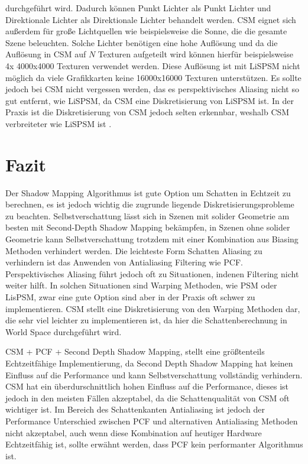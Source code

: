 durchgeführt wird. 
Dadurch können Punkt Lichter als Punkt Lichter und Direktionale Lichter als Direktionale Lichter behandelt werden.
CSM eignet sich außerdem für große Lichtquellen wie beispielsweise die Sonne, die die gesamte Szene beleuchten.
Solche Lichter benötigen eine hohe Auflösung und da die Auflösung in CSM auf $N$ Texturen aufgeteilt wird können hierfür beispielsweise 
4x 4000x4000 Texturen verwendet werden. Diese Auflösung ist mit LiSPSM nicht möglich da viele Grafikkarten keine
16000x16000 Texturen unterstützen.
Es sollte jedoch bei CSM nicht vergessen werden, das es perspektivisches Aliasing nicht so gut entfernt, wie 
LiSPSM, da CSM eine Diskretisierung von LiSPSM ist.
In der Praxis ist die Diskretisierung von CSM jedoch selten erkennbar, weshalb CSM verbreiteter wie LiSPSM ist \cite{Survey2011}.

\chapter{Fazit}
Der Shadow Mapping Algorithmus ist gute Option um Schatten in Echtzeit zu berechnen,
es ist jedoch wichtig die zugrunde liegende Diskretisierungsprobleme zu beachten.
Selbstverschattung lässt sich in Szenen mit solider Geometrie am besten mit Second-Depth Shadow Mapping bekämpfen,
in Szenen ohne solider Geometrie kann Selbstverschattung trotzdem mit einer Kombination aus Biasing Methoden verhindert werden.
Die leichteste Form Schatten Aliasing zu verhindern ist das Anwenden von Antialiasing Filtering wie PCF.
Perspektivisches Aliasing führt jedoch oft zu Situationen, indenen Filtering nicht weiter hilft.
In solchen Situationen sind Warping Methoden, wie PSM oder LisPSM, zwar eine gute Option sind aber in der Praxis oft schwer zu implementieren.
CSM stellt eine Diskretisierung von den Warping Methoden dar, die sehr viel leichter zu implementieren ist, da hier die Schattenberechnung in 
World Space durchgeführt wird.
\par
CSM + PCF + Second Depth Shadow Mapping, stellt eine größtenteils Echtzeitfähige Implementierung, da
Second Depth Shadow Mapping hat keinen Einfluss auf die Performance und kann Selbstverschattung vollständig verhindern.
CSM hat ein überdurschnittlich hohen Einfluss auf die Performance, dieses ist jedoch 
in den meisten Fällen akzeptabel, da die Schattenqualität von CSM oft wichtiger ist.
Im Bereich des Schattenkanten Antialiasing ist jedoch der Performance Unterschied zwischen PCF und alternativen 
Antialiasing Methoden nicht akzeptabel, auch wenn diese Kombination auf heutiger Hardware Echtzeitfähig ist, 
sollte erwähnt werden, dass PCF kein performanter Algorithmus ist.

















